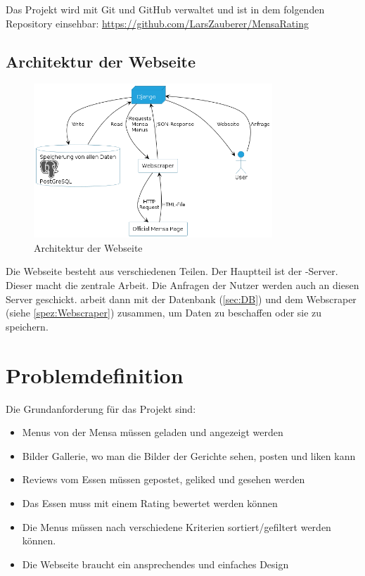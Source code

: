 Das Projekt wird mit Git und GitHub verwaltet und ist in dem folgenden
Repository einsehbar: \url{https://github.com/LarsZauberer/MensaRating}

\newpage

\subsection{Architektur der Webseite}
\begin{figure}[ht]
    \centering
    \includegraphics[width=0.8\textwidth]{images/Webseite.png}
    \caption{Architektur der Webseite}
    \label{fig:Website}
\end{figure}

Die Webseite besteht aus verschiedenen Teilen. Der Hauptteil ist der
-Server. Dieser macht die zentrale Arbeit. Die Anfragen der Nutzer
werden auch an diesen Server geschickt.  arbeit dann mit der
Datenbank (\ref{sec:DB}) und dem Webscraper (siehe \ref{spez:Webscraper})
zusammen, um Daten zu beschaffen oder sie zu speichern.

\newpage

\section{Problemdefinition}\label{sec:problemdefinition}

Die Grundanforderung für das Projekt sind:
\begin{itemize}
    \item Menus von der Mensa müssen geladen und angezeigt werden
    \item Bilder Gallerie, wo man die Bilder der Gerichte sehen, posten und liken kann
    \item Reviews vom Essen müssen gepostet, geliked und gesehen werden
    \item Das Essen muss mit einem Rating bewertet werden können
    \item Die Menus müssen nach verschiedene Kriterien sortiert/gefiltert werden können.
    \item Die Webseite braucht ein ansprechendes und einfaches Design
\end{itemize}

